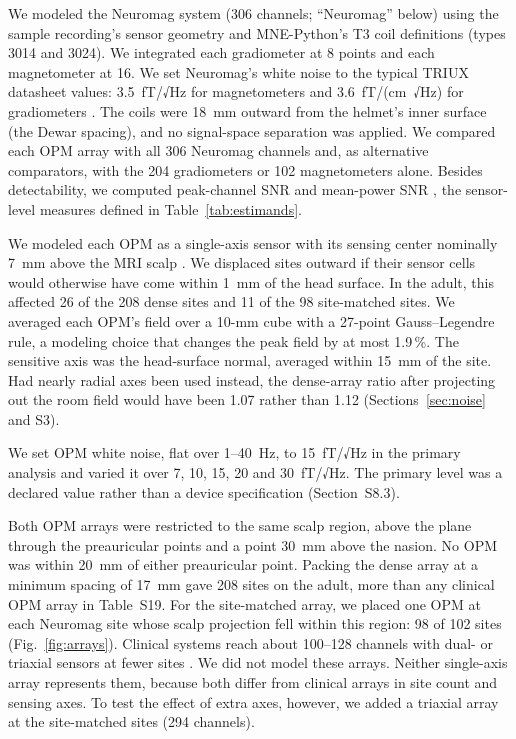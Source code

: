 \documentclass[preprint,12pt,authoryear,a4paper]{elsarticle}
\begin{document}
We modeled the Neuromag system (306 channels; ``Neuromag'' below) using the sample recording's sensor geometry and MNE-Python's T3 coil definitions (types 3014 and 3024). We integrated each gradiometer at 8 points and each magnetometer at 16. We set Neuromag's white noise to the typical TRIUX datasheet values: 3.5~fT/√Hz for magnetometers and 3.6~fT/(cm~√Hz) for gradiometers \citep{elekta_triux}. The coils were 18~mm outward from the helmet's inner surface (the Dewar spacing), and no signal-space separation was applied. We compared each OPM array with all 306 Neuromag channels and, as alternative comparators, with the 204 gradiometers or 102 magnetometers alone. Besides detectability, we computed peak-channel SNR and mean-power SNR \citep{goldenholz2009}, the sensor-level measures defined in Table~\ref{tab:estimands}.

We modeled each OPM as a single-axis sensor with its sensing center nominally 7~mm above the MRI scalp \citep{alem2023,osborne2018}. We displaced sites outward if their sensor cells would otherwise have come within 1~mm of the head surface. In the adult, this affected 26 of the 208 dense sites and 11 of the 98 site-matched sites. We averaged each OPM's field over a 10-mm cube with a 27-point Gauss--Legendre rule, a modeling choice that changes the peak field by at most 1.9\,\%. The sensitive axis was the head-surface normal, averaged within 15~mm of the site. Had nearly radial axes been used instead, the dense-array ratio after projecting out the room field would have been 1.07 rather than 1.12 (Sections~\ref{sec:noise} and S3).

We set OPM white noise, flat over 1–40~Hz, to 15~fT/√Hz in the primary analysis and varied it over 7, 10, 15, 20 and 30~fT/√Hz. The primary level was a declared value rather than a device specification (Section~S8.3).

Both OPM arrays were restricted to the same scalp region, above the plane through the preauricular points and a point 30~mm above the nasion. No OPM was within 20~mm of either preauricular point. Packing the dense array at a minimum spacing of 17~mm gave 208 sites on the adult, more than any clinical OPM array in Table~S19. For the site-matched array, we placed one OPM at each Neuromag site whose scalp projection fell within this region: 98 of 102 sites (Fig.~\ref{fig:arrays}). Clinical systems reach about 100--128 channels with dual- or triaxial sensors at fewer sites \citep{feys2025,shen2026}. We did not model these arrays. Neither single-axis array represents them, because both differ from clinical arrays in site count and sensing axes. To test the effect of extra axes, however, we added a triaxial array at the site-matched sites (294 channels).
\end{document}
